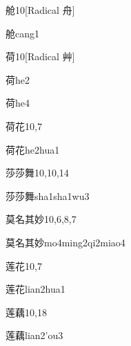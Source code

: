 \begin{entry}{舱}{10}[Radical ⾈]
  \begin{phonetics}{舱}{cang1}
  \end{phonetics}
\end{entry}

\begin{entry}{荷}{10}[Radical 艸]
  \begin{phonetics}{荷}{he2}
  \end{phonetics}
  \begin{phonetics}{荷}{he4}
  \end{phonetics}
\end{entry}

\begin{entry}{荷花}{10,7}
  \begin{phonetics}{荷花}{he2hua1}
  \end{phonetics}
\end{entry}

\begin{entry}{莎莎舞}{10,10,14}
  \begin{phonetics}{莎莎舞}{sha1sha1wu3}
  \end{phonetics}
\end{entry}

\begin{entry}{莫名其妙}{10,6,8,7}
  \begin{phonetics}{莫名其妙}{mo4ming2qi2miao4}
  \end{phonetics}
\end{entry}

\begin{entry}{莲花}{10,7}
  \begin{phonetics}{莲花}{lian2hua1}
  \end{phonetics}
\end{entry}

\begin{entry}{莲藕}{10,18}
  \begin{phonetics}{莲藕}{lian2'ou3}
  \end{phonetics}
\end{entry}

